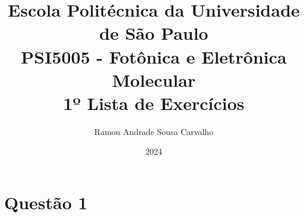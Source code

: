 \documentclass[12pt,twoside]{article}
\title{
{\large Escola Politécnica da Universidade de São Paulo}\\
\vspace*{1.0cm}
{\small PSI5005 - Fotônica e Eletrônica Molecular}\\
{1º Lista de Exercícios}
\vspace*{1.0cm}
}
\author{
	Ramon Andrade Sousa Carvalho
}
\date{2024}
\begin{document}
\maketitle

\section*{Questão 1}

\end{document}

